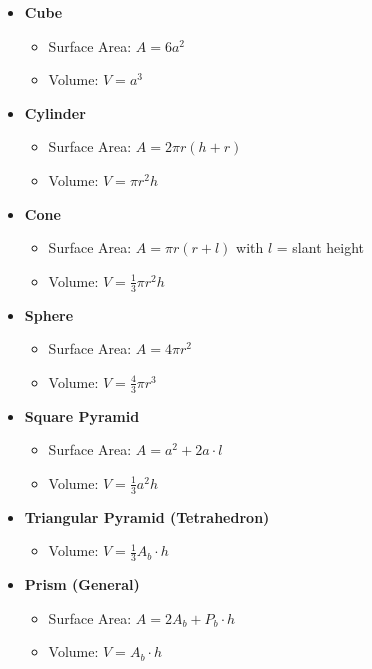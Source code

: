 \begin{itemize}
	\item \textbf{Cube}
	      \begin{itemize}
		      \item Surface Area: \(A = 6a^2\)
		      \item Volume: \(V = a^3\)
	      \end{itemize}

	\item \textbf{Cylinder}
	      \begin{itemize}
		      \item Surface Area: \(A = 2\pi r(h + r)\)
		      \item Volume: \(V = \pi r^2 h\)
	      \end{itemize}

	\item \textbf{Cone}
	      \begin{itemize}
		      \item Surface Area: \(A = \pi r(r + l)\) with \(l\) = slant height
		      \item Volume: \(V = \frac{1}{3}\pi r^2 h\)
	      \end{itemize}

	\item \textbf{Sphere}
	      \begin{itemize}
		      \item Surface Area: \(A = 4\pi r^2\)
		      \item Volume: \(V = \frac{4}{3} \pi r^3\)
	      \end{itemize}

	\item \textbf{Square Pyramid}
	      \begin{itemize}
		      \item Surface Area: \(A = a^2 + 2a \cdot l\)
		      \item Volume: \(V = \frac{1}{3} a^2 h\)
	      \end{itemize}

	\item \textbf{Triangular Pyramid (Tetrahedron)}
	      \begin{itemize}
		      \item Volume: \(V = \frac{1}{3} A_b \cdot h\)
	      \end{itemize}

	\item \textbf{Prism (General)}
	      \begin{itemize}
		      \item Surface Area: \(A = 2A_b + P_b \cdot h\)
		      \item Volume: \(V = A_b \cdot h\)
	      \end{itemize}
\end{itemize}

